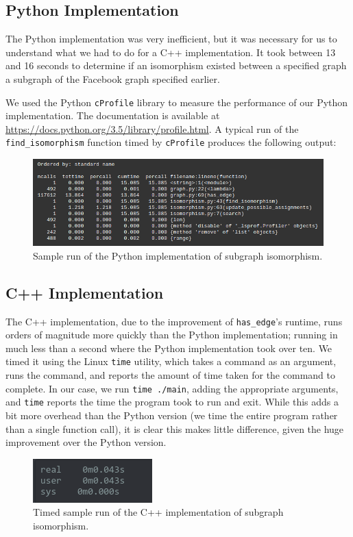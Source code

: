 \documentclass{article}
\begin{document}
  \subsection{Python Implementation}
  The Python implementation was very inefficient, but it was necessary for us to understand what we had to do for a C++ implementation. It took between 13 and 16 seconds to determine if an isomorphism existed between a specified graph a subgraph of the Facebook graph specified earlier.

  We used the Python \texttt{cProfile} library to measure the performance of our Python implementation. The documentation is available at \url{https://docs.python.org/3.5/library/profile.html}. A typical run of the \texttt{find\_isomorphism} function timed by \texttt{cProfile} produces the following output:

  \begin{figure}[H]
    \centering
    \includegraphics[scale=0.6]{images/perf}
    \caption{Sample run of the Python implementation of subgraph isomorphism.}
  \end{figure}

  \subsection{C++ Implementation}
  The C++ implementation, due to the improvement of \texttt{has\_edge}'s runtime, runs orders of magnitude more quickly than the Python implementation; running in much less than a second where the Python implementation took over ten. We timed it using the Linux \texttt{time} utility, which takes a command as an argument, runs the command, and reports the amount of time taken for the command to complete. In our case, we run \texttt{time ./main}, adding the appropriate arguments, and \texttt{time} reports the time the program took to run and exit. While this adds a bit more overhead than the Python version (we time the entire program rather than a single function call), it is clear this makes little difference, given the huge improvement over the Python version.

  \begin{figure}[H]
    \centering
    \includegraphics[scale=0.6]{images/cperf}
    \caption{Timed sample run of the C++ implementation of subgraph isomorphism.}
  \end{figure}
\end{document}
